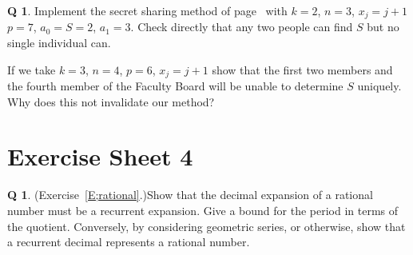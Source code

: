 \documentclass[12pt,a4paper]{article}
\theoremstyle{plain}
\theoremstyle{definition}
\newtheorem{question}[theorem]{Q}
\begin{document}
    \begin{question}
        \label{C3.15} Implement the secret sharing method
        of page~\pageref{P;secret sharing} with $k=2$, $n=3$, $x_{j}=j+1$
        $p=7$, $a_{0}=S=2$, $a_{1}=3$. Check directly that any two
        people
        can find $S$ but no single individual can.

        If we take $k=3$, $n=4$,
        $p=6$,  $x_{j}=j+1$ show that
        the first two members and the
        fourth member of the Faculty Board will
        be unable to determine $S$ uniquely.
        Why does this not invalidate our method?
    \end{question}
    \newpage
    \section{Exercise Sheet 4}
    \begin{question}
        (Exercise~\ref{E;rational}.)\label{C4.1}
        Show that the decimal expansion of
        a rational number must be a recurrent expansion.
        Give a bound for the period in terms of the quotient.
        Conversely, by considering geometric series, or otherwise,
        show that a recurrent decimal represents
        a rational number.
    \end{question}
\end{document}
